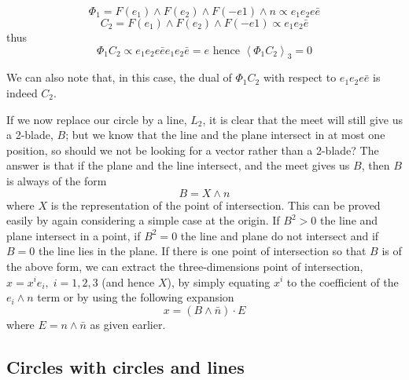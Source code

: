 \[
\Phi_1 = F(e_1) \wedge F(e_2) \wedge F(-e1) \wedge n \propto e_1e_2e\bar{e}
\]
\[
C_2 = F(e_1) \wedge F(e_2) \wedge F(-e1) \propto e_1e_2\bar{e}
\]
thus
\[
\Phi_1C_2 \propto e_1e_2e\bar{e}e_1e_2\bar{e} = e \mbox{ hence }
\left<\Phi_1C_2\right>_3 = 0
\]

We can also note that, in this case, the dual of $\Phi_1C_2$ with respect to
$e_1e_2e\bar{e}$ is indeed $C_2$.

If we now replace our circle by a line, $L_2$, it is
clear that the meet will still give us a 2-blade, $B$;
but we know that the line and the plane intersect in at
most one position, so should we not be looking for a
vector rather than a 2-blade? The answer is that if the
plane and the line intersect, and the meet gives us $B$,
then $B$ is always of the form
%
\[  B = X\wedge n  \]
%
where $X$ is the representation of the point of intersection. This can be
proved easily by again considering a simple case at the
origin. If $B^2>0$ the line and plane intersect in a
point, if $B^2=0$ the line and plane do not intersect and
if $B=0$ the line lies in the plane. If there is one
point of intersection so that $B$ is of the above form,
we can extract the three-dimensions point of intersection,
$x=x^ie_i,\;i=1,2,3$ (and hence $X$), by simply equating
$x^i$ to the coefficient of the $e_i\wedge n$ term or by
using the following expansion
%
\begin{equation}
 x = (B\wedge \bar{n})\cdot E
 \end{equation}
%
where $E=n\wedge \bar{n}$ as given earlier.


\subsection{Circles with circles and lines }

